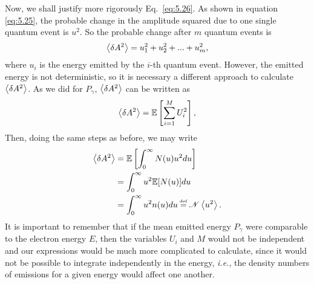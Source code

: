 Now, we shall justify more rigorously Eq.~\eqref{eq:5.26}. As shown in equation \eqref{eq:5.25}, the probable change in the amplitude squared due to one single quantum event is $u^2$. So the probable change after $m$ quantum events is
\begin{align}
	\left< \delta A^2 \right> = u_1^2 + u_2^2 + ... + u_m^2,
\end{align}
where $u_i$ is the energy emitted by the $i$-th quantum event. However, the emitted energy is not deterministic, so it is necessary a different approach to calculate $\left< \delta A^2 \right>$.
As we did for $P_\gamma$, $\left< \delta A^2 \right>$ can be written as
\begin{align}
	\left< \delta A^2 \right> = \mathbb{E} \left[ \sum_{i=1}^M U_i^2 \right],
\end{align}
Then, doing the same steps as before, we may write
\begin{align*}
	\mean{\delta A^2} &= \mathbb{E}\left[ \int_0^\infty N(u) u^2 du \right]\\
    		&= \int_0^\infty u^2 \mathbb{E}[N(u)] du\\
            &= \int_0^\infty u^2 n(u) du \bydef \mathscr{N} \mean{u^2}.
\end{align*}
It is important to remember that if the mean emitted energy $P_\gamma$ were comparable to the electron energy $E$, then the variables $U_i$ and $M$ would not be independent and our expressions would be much more complicated to calculate, since it would not be possible to integrate independently in the energy, \textit{i.e.}, the density numbers of emissions for a given energy would affect one another.
